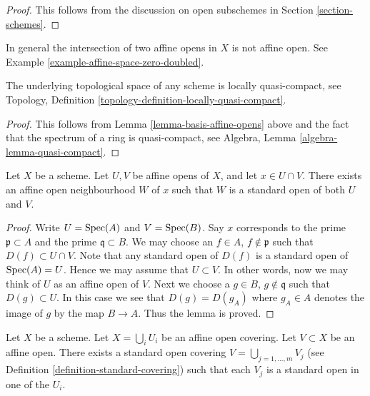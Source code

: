 \begin{proof}
This follows from the discussion on open subschemes
in Section \ref{section-schemes}.
\end{proof}

\begin{remark}
\label{remark-intersection-affine-opens}
In general the intersection of two affine opens in $X$
is not affine open. See Example \ref{example-affine-space-zero-doubled}.
\end{remark}

\begin{lemma}
\label{lemma-locally-quasi-compact}
The underlying topological space of any scheme is
locally quasi-compact, see
Topology, Definition \ref{topology-definition-locally-quasi-compact}.
\end{lemma}

\begin{proof}
This follows from Lemma \ref{lemma-basis-affine-opens} above
and the fact that the spectrum of a ring is quasi-compact, see
Algebra, Lemma \ref{algebra-lemma-quasi-compact}.
\end{proof}

\begin{lemma}
\label{lemma-standard-open-two-affines}
Let $X$ be a scheme.
Let $U, V$ be affine opens of $X$, and let $x \in U \cap V$.
There exists an affine open neighbourhood $W$ of $x$
such that $W$ is a standard open of both $U$ and $V$.
\end{lemma}

\begin{proof}
Write $U = \mathop{\mathrm{Spec}}(A)$ and $V = \mathop{\mathrm{Spec}}(B)$.
Say $x$ corresponds to the prime $\mathfrak p \subset A$
and the prime $\mathfrak q \subset B$.
We may choose an $f \in A$, $f \not \in \mathfrak p$ such that
$D(f) \subset U \cap V$. Note that any standard open of $D(f)$
is a standard open of $\mathop{\mathrm{Spec}}(A) = U$. Hence we may assume
that $U \subset V$. In other words, now we may think of $U$
as an affine open of $V$. Next we choose a
$g \in B$, $g \not \in \mathfrak q$ such that
$D(g) \subset U$. In this case we see that $D(g) = D(g_A)$
where $g_A \in A$ denotes the image of $g$ by the map $B \to A$.
Thus the lemma is proved.
\end{proof}

\begin{lemma}
\label{lemma-good-subcover}
Let $X$ be a scheme.
Let $X = \bigcup_i U_i$ be an affine open covering.
Let $V \subset X$ be an affine open.
There exists a standard open covering
$V = \bigcup_{j = 1, \ldots, m} V_j$ (see
Definition \ref{definition-standard-covering})
such that each $V_j$ is a standard open in one of the $U_i$.
\end{lemma}

